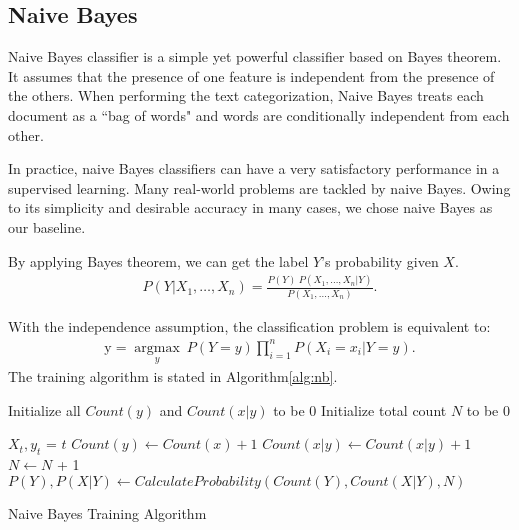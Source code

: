 
\subsection{Naive Bayes}
Naive Bayes classifier is a simple yet powerful classifier based on Bayes theorem. It assumes that the presence of one feature is independent from the presence of the others. When performing the text categorization, Naive Bayes treats each document as a ``bag of words" and words are conditionally independent from each other.

In practice, naive Bayes classifiers can have a very satisfactory performance in a supervised learning. Many real-world problems are tackled by naive Bayes. Owing to its simplicity and desirable accuracy in many cases, we chose naive Bayes as our baseline.

By applying Bayes theorem, we can get the label $Y$'s probability given $X$.
\begin{gather}
    P(Y \vert X_1,\dots,X_n) = \frac{P(Y) \ P(X_1,\dots,X_n\vert Y)}{P(X_1,\dots,X_n)}. 
\end{gather}

With the independence assumption, the classification problem is equivalent to:
\begin{gather}
    \mathrm{y} = \underset{y}{\operatorname{argmax}} \ P(Y=y) \displaystyle\prod_{i=1}^n P(X_i=x_i\vert Y=y).
\end{gather}
The training algorithm is stated in Algorithm\ref{alg:nb}.

\IncMargin{1em}
\begin{algorithm}
\label{alg:nb}
\BlankLine
Initialize all $Count(y)$ and $Count(x|y)$ to be 0\;
Initialize total count $N$ to be 0\;

 {
    $X_t, y_t$ = $t$\;
     {
        $Count(y) \leftarrow Count(x) + 1$ \;
        $Count(x|y) \leftarrow Count(x|y) + 1$ \;
        $N \leftarrow N$ + 1 \;
    }
}
\Return $P(Y), P(X|Y) \leftarrow CalculateProbability(Count(Y), Count(X|Y), N)$

\caption{Naive Bayes Training Algorithm}\label{algo_disjdecomp}
\end{algorithm}
\DecMargin{1em}

